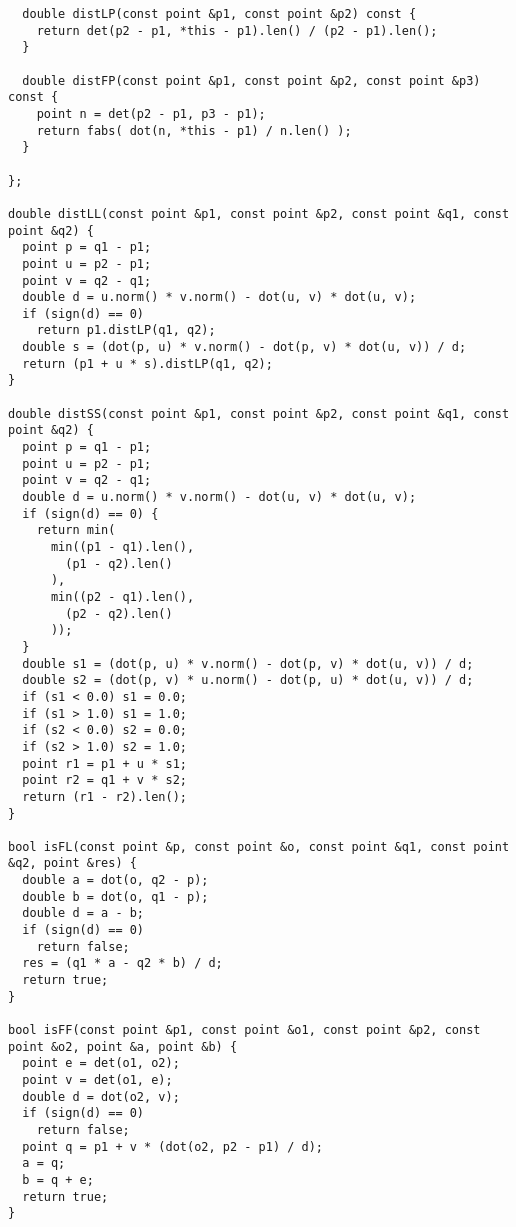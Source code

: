 \begin{lstlisting}
  double distLP(const point &p1, const point &p2) const {
    return det(p2 - p1, *this - p1).len() / (p2 - p1).len();
  }

  double distFP(const point &p1, const point &p2, const point &p3) const {
    point n = det(p2 - p1, p3 - p1);
    return fabs( dot(n, *this - p1) / n.len() );
  }

};

double distLL(const point &p1, const point &p2, const point &q1, const point &q2) {
  point p = q1 - p1;
  point u = p2 - p1;
  point v = q2 - q1;
  double d = u.norm() * v.norm() - dot(u, v) * dot(u, v);
  if (sign(d) == 0)
    return p1.distLP(q1, q2);
  double s = (dot(p, u) * v.norm() - dot(p, v) * dot(u, v)) / d;
  return (p1 + u * s).distLP(q1, q2);
}

double distSS(const point &p1, const point &p2, const point &q1, const point &q2) {
  point p = q1 - p1;
  point u = p2 - p1;
  point v = q2 - q1;
  double d = u.norm() * v.norm() - dot(u, v) * dot(u, v);
  if (sign(d) == 0) {
    return min(
      min((p1 - q1).len(),
        (p1 - q2).len()
      ),
      min((p2 - q1).len(),
        (p2 - q2).len()
      ));
  }
  double s1 = (dot(p, u) * v.norm() - dot(p, v) * dot(u, v)) / d;
  double s2 = (dot(p, v) * u.norm() - dot(p, u) * dot(u, v)) / d;
  if (s1 < 0.0) s1 = 0.0;
  if (s1 > 1.0) s1 = 1.0;
  if (s2 < 0.0) s2 = 0.0;
  if (s2 > 1.0) s2 = 1.0;
  point r1 = p1 + u * s1;
  point r2 = q1 + v * s2;
  return (r1 - r2).len();
}

bool isFL(const point &p, const point &o, const point &q1, const point &q2, point &res) {
  double a = dot(o, q2 - p);
  double b = dot(o, q1 - p);
  double d = a - b;
  if (sign(d) == 0)
    return false;
  res = (q1 * a - q2 * b) / d;
  return true;
}

bool isFF(const point &p1, const point &o1, const point &p2, const point &o2, point &a, point &b) {
  point e = det(o1, o2);
  point v = det(o1, e);
  double d = dot(o2, v);
  if (sign(d) == 0)
    return false;
  point q = p1 + v * (dot(o2, p2 - p1) / d);
  a = q;
  b = q + e;
  return true;
}

\end{lstlisting}
